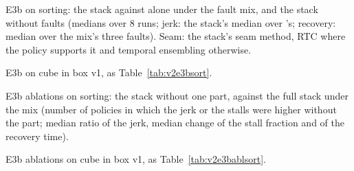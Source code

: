 \begin{table}[htbp]
  \centering
  \small
  \begin{adjustbox}{max width=\textwidth}
  \end{adjustbox}
  \caption{E3b on sorting: the stack against \drtc{} alone under the fault mix, and the stack without faults (medians
           over 8 runs; jerk: the stack's median over \drtc's; recovery: median over the mix's three faults). Seam: the
           stack's seam method, RTC where the policy supports it and temporal ensembling otherwise.}\label{tab:v2e3bsort}
\end{table}

\begin{table}[htbp]
  \centering
  \small
  \begin{adjustbox}{max width=\textwidth}
  \end{adjustbox}
  \caption{E3b on cube in box v1, as Table~\ref{tab:v2e3bsort}.}\label{tab:v2e3bcube}
\end{table}

\begin{table}[htbp]
  \centering
  \small
  \caption{E3b ablations on sorting: the stack without one part, against the full stack under the mix (number of
           policies in which the jerk or the stalls were higher without the part; median ratio of the jerk, median
           change of the stall fraction and of the recovery time).}\label{tab:v2e3bablsort}
\end{table}

\begin{table}[htbp]
  \centering
  \small
  \caption{E3b ablations on cube in box v1, as Table~\ref{tab:v2e3bablsort}.}\label{tab:v2e3bablcube}
\end{table}

